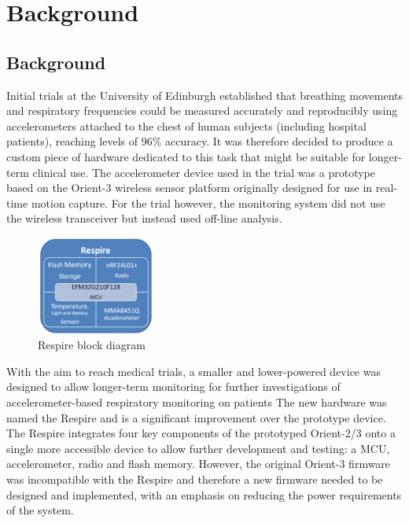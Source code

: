 \chapter{Background}

\section{Background}
Initial trials at the University of Edinburgh established that breathing movements and respiratory
frequencies could be measured accurately and reproducibly using accelerometers attached to the
chest of human subjects (including hospital patients), reaching levels of 96\% accuracy.
It was therefore decided to produce a custom piece of hardware dedicated
to this task that might be suitable for longer-term clinical use. The accelerometer device used in the
trial was a prototype based on the Orient-3 wireless sensor platform originally designed for use in
real-time motion capture. For the trial however, the monitoring system did not use the wireless
transceiver but instead used off-line analysis.

\begin{figure}
  \vspace{-10pt}
  \begin{center}
    \includegraphics[width=0.35\textwidth, keepaspectratio=true]{images/respire_block.png}
  \end{center}
  \caption[Respire Block Diagram]{Respire block diagram}
  \vspace{-10pt}
\end{figure}

With the aim to reach medical trials, a smaller and lower-powered device was designed to allow
longer-term monitoring for further investigations of accelerometer-based respiratory monitoring on
patients The new hardware was named the Respire and is a significant improvement over the
prototype device. The Respire integrates four key components of the prototyped Orient-2/3 onto a
single more accessible device to allow further development and testing: a \ac{MCU},
accelerometer, radio and flash memory. However, the original Orient-3 firmware was incompatible
with the Respire and therefore a new firmware needed to be designed and implemented, with an
emphasis on reducing the power requirements of the system.

